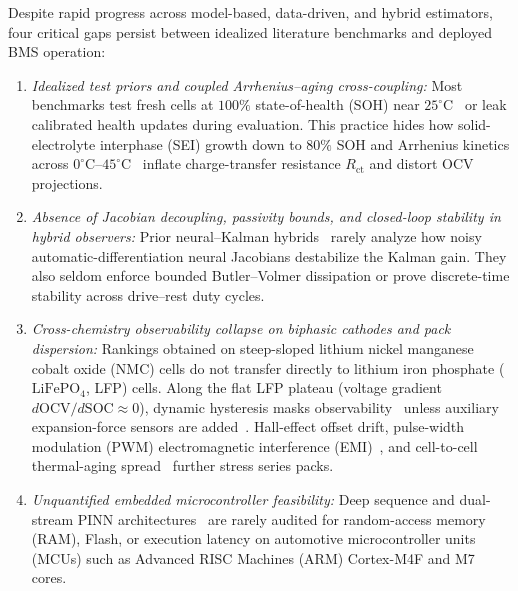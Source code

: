 \documentclass[10pt,a4paper]{article}
\begin{document}
Despite rapid progress across model-based, data-driven, and hybrid estimators, four critical gaps persist between idealized literature benchmarks and deployed BMS operation:
\begin{enumerate}
\item \emph{Idealized test priors and coupled Arrhenius--aging cross-coupling:} Most benchmarks test fresh cells at $100\%$ state-of-health (SOH) near $25^\circ\text{C}$~\cite{Hu2012ecm,Chemali2018dnn,Le2026charging} or leak calibrated health updates during evaluation. This practice hides how solid-electrolyte interphase (SEI) growth down to $80\%$ SOH and Arrhenius kinetics across $0^\circ\text{C}\text{--}45^\circ\text{C}$~\cite{He2011ecm,Ren2019aging} inflate charge-transfer resistance $R_{\text{ct}}$ and distort OCV projections.
\item \emph{Absence of Jacobian decoupling, passivity bounds, and closed-loop stability in hybrid observers:} Prior neural--Kalman hybrids~\cite{Charkhgard2010dekf,Tu2023hybrid,Wang2024aekf_lstm,Shen2025kf,Yu2025lstm_ekf} rarely analyze how noisy automatic-differentiation neural Jacobians destabilize the Kalman gain. They also seldom enforce bounded Butler--Volmer dissipation or prove discrete-time stability across drive--rest duty cycles.
\item \emph{Cross-chemistry observability collapse on biphasic cathodes and pack dispersion:} Rankings obtained on steep-sloped lithium nickel manganese cobalt oxide (NMC) cells do not transfer directly to lithium iron phosphate ($\text{LiFePO}_4$, LFP) cells. Along the flat LFP plateau (voltage gradient $d\text{OCV}/d\text{SOC} \approx 0$), dynamic hysteresis masks observability~\cite{Roscher2011hysteresis,Verbrugge2004hysteresis,Marongiu2016hyst} unless auxiliary expansion-force sensors are added~\cite{Tian2025}. Hall-effect offset drift, pulse-width modulation (PWM) electromagnetic interference (EMI)~\cite{Hashemi2020}, and cell-to-cell thermal-aging spread~\cite{Yang2024degradation,Zheng2018inconsistency} further stress series packs.
\item \emph{Unquantified embedded microcontroller feasibility:} Deep sequence and dual-stream PINN architectures~\cite{Song2019bilstm,Bhattacharya2024gpr,Zhou2025dualstream_jes} are rarely audited for random-access memory (RAM), Flash, or execution latency on automotive microcontroller units (MCUs) such as Advanced RISC Machines (ARM) Cortex-M4F and M7 cores.
\end{enumerate}
\end{document}
